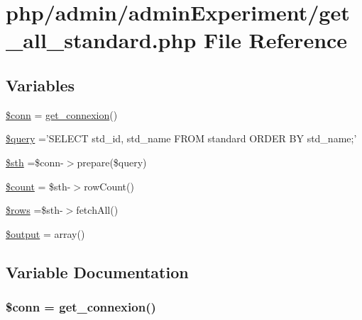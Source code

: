 \hypertarget{get__all__standard_8php}{\section{php/admin/admin\-Experiment/get\-\_\-all\-\_\-standard.php File Reference}
\label{get__all__standard_8php}
}
\subsection*{Variables}
\begin{DoxyCompactItemize}
\item 
\hyperlink{get__all__standard_8php_aa8a5a87b9c1a6a0819b88447cbe41877}{\$conn} = \hyperlink{php__functions_8php_ace18bc10f3fd08f92688ac743e0d8c2e}{get\-\_\-connexion}()
\item 
\hyperlink{get__all__standard_8php_af59a5f7cd609e592c41dc3643efd3c98}{\$query} ='S\-E\-L\-E\-C\-T std\-\_\-id, std\-\_\-name F\-R\-O\-M standard O\-R\-D\-E\-R B\-Y std\-\_\-name;'
\item 
\hyperlink{get__all__standard_8php_afa9126f9664959c02795be300a135f93}{\$sth} =\$conn-\/$>$prepare(\$query)
\item 
\hyperlink{get__all__standard_8php_af789423037bbc89dc7c850e761177570}{\$count} = \$sth-\/$>$row\-Count()
\item 
\hyperlink{get__all__standard_8php_ace2ec39e7df3899fa8df9640ec274b03}{\$rows} =\$sth-\/$>$fetch\-All()
\item 
\hyperlink{get__all__standard_8php_a73004ce9cd673c1bfafd1dc351134797}{\$output} = array()
\end{DoxyCompactItemize}


\subsection{Variable Documentation}
\hypertarget{get__all__standard_8php_aa8a5a87b9c1a6a0819b88447cbe41877}{
\subsubsection[{\$conn}]{\setlength{\rightskip}{0pt plus 5cm}\$conn = {\bf get\-\_\-connexion}()}}\label{get__all__standard_8php_aa8a5a87b9c1a6a0819b88447cbe41877}


